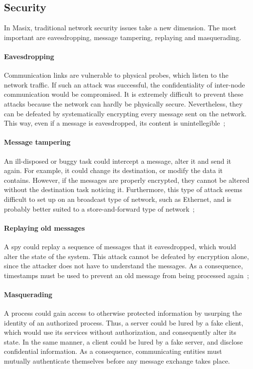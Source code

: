 \subsection{Security}

In Masix, traditional network security issues take a new dimension.
The most important are eavesdropping, message tampering, replaying and
masquerading.

\paragraph{Eavesdropping} 
Communication links are vulnerable to physical probes, 
which listen to the network traffic. If such an attack was successful, the
 confidentiality of inter-node communication would be compromised. It is 
extremely difficult to prevent these attacks because the network can hardly be 
physically secure. Nevertheless, they can be defeated by systematically 
encrypting every message sent on the network. This way, even if a message is 
eavesdropped, its content is unintellegible~; 

\paragraph{Message tampering} 
An ill-disposed or buggy task could intercept 
a message, alter it and send it again. For example, it could change its 
destination, or modify the data it contains. However, if the messages 
are properly encrypted, they cannot be altered without the destination task 
noticing it. Furthermore, this type of attack seems difficult to set up on 
an broadcast type of network, such as Ethernet, and is probably better 
suited to a store-and-forward type of network~;

\paragraph{Replaying old messages} 
A spy could replay a sequence of messages that 
it eavesdropped, which would alter the state of the system. This attack cannot
 be defeated by encryption alone, since the attacker does not have to understand the messages. As a consequence, timestamps must be used to prevent an old 
message from being processed again~;

\paragraph{Masquerading}
A process could gain access to otherwise protected 
information by usurping the identity of an authorized process. Thus, a server 
could be lured by a fake client, which would use its services without 
authorization, and consequently alter its state. In the same manner, a client 
could be lured by a fake server, and disclose confidential information.
As a consequence, communicating entities must mutually authenticate
themselves before any message exchange takes place.

